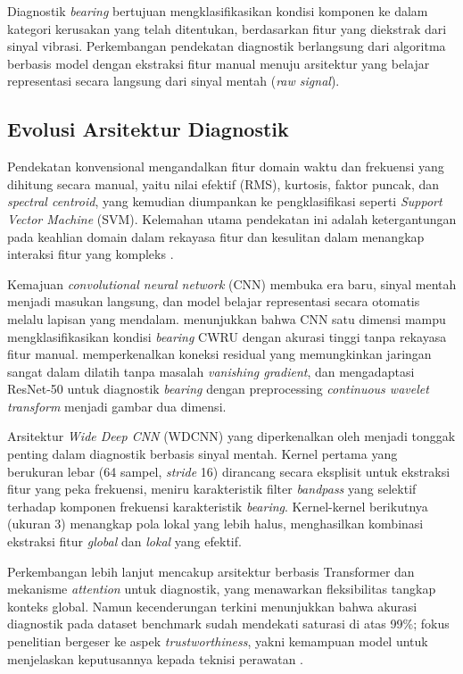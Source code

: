 Diagnostik \emph{bearing} bertujuan mengklasifikasikan kondisi komponen ke dalam
kategori kerusakan yang telah ditentukan, berdasarkan fitur yang diekstrak
dari sinyal vibrasi. Perkembangan pendekatan diagnostik berlangsung dari
algoritma berbasis model dengan ekstraksi fitur manual menuju arsitektur yang belajar
representasi secara langsung dari sinyal mentah (\emph{raw signal}).

\subsection{Evolusi Arsitektur Diagnostik}
\label{subsec:bab2_evolusi_arsitektur}

Pendekatan konvensional mengandalkan fitur domain waktu dan frekuensi yang
dihitung secara manual, yaitu nilai efektif (RMS), kurtosis, faktor puncak,
dan \emph{spectral centroid}, yang kemudian diumpankan ke pengklasifikasi
seperti \emph{Support Vector Machine} (SVM). Kelemahan utama pendekatan ini
adalah ketergantungan pada keahlian domain dalam rekayasa fitur dan
kesulitan dalam menangkap interaksi fitur yang kompleks .

Kemajuan \emph{convolutional neural network} (CNN) membuka era baru, sinyal
mentah menjadi masukan langsung, dan model belajar representasi secara
otomatis melalu lapisan yang mendalam.  menunjukkan bahwa CNN satu dimensi mampu
mengklasifikasikan kondisi \emph{bearing} CWRU dengan akurasi tinggi tanpa rekayasa
fitur manual.  memperkenalkan koneksi residual yang
memungkinkan jaringan sangat dalam dilatih tanpa masalah \emph{vanishing gradient},
dan  mengadaptasi ResNet-50 untuk diagnostik
\emph{bearing} dengan preprocessing \emph{continuous wavelet transform} menjadi gambar
dua dimensi.

Arsitektur \emph{Wide Deep CNN} (WDCNN) yang diperkenalkan oleh
 menjadi tonggak penting dalam diagnostik berbasis
sinyal mentah. Kernel pertama yang berukuran lebar (64 sampel, \emph{stride} 16)
dirancang secara eksplisit untuk ekstraksi fitur yang peka frekuensi, meniru
karakteristik filter \emph{bandpass} yang selektif terhadap komponen frekuensi
karakteristik \emph{bearing}. Kernel-kernel berikutnya (ukuran 3) menangkap pola
lokal yang lebih halus, menghasilkan kombinasi ekstraksi fitur \emph{global}
dan \emph{lokal} yang efektif.

Perkembangan lebih lanjut mencakup arsitektur berbasis Transformer dan
mekanisme \emph{attention} untuk diagnostik, yang menawarkan fleksibilitas
tangkap konteks global. Namun kecenderungan terkini menunjukkan bahwa akurasi
diagnostik pada dataset benchmark sudah mendekati saturasi di atas 99\%; fokus
penelitian bergeser ke aspek \emph{trustworthiness}, yakni kemampuan model untuk
menjelaskan keputusannya kepada teknisi perawatan
.

